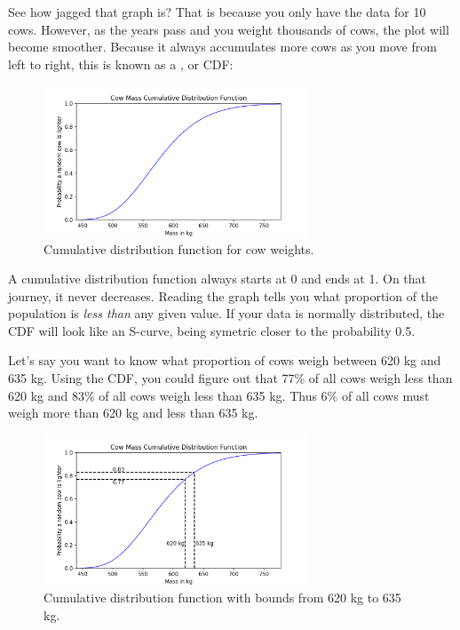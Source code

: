 See how jagged that graph is?  That is because you only have the data for 10 cows. However, as the years pass and you weight thousands of cows, the plot will become smoother. Because it
always accumulates more cows as you move from left to right, this is known as a , or CDF:
\begin{figure}[htbp]
    \centering
    \includegraphics[width=0.7\textwidth]{cow_cdf.png}
    \caption{Cumulative distribution function for cow weights.}
    \label{fig:cowcdf}
\end{figure}

A cumulative distribution function always starts at 0 and ends at 1. On that journey, it never decreases. Reading the graph tells you what proportion of the population is \emph{less than} any given value. If your data is normally distributed,  the CDF will look like an S-curve, being symetric closer to the probability 0.5. 

Let's say you want to know what proportion of cows weigh between 620 kg and 635 kg. Using the CDF, you could figure out that 77\% of all cows weigh less than 620 kg and 83\% of all cows 
weigh less than 635 kg. Thus 6\% of all cows must weigh more than 620 kg and less than 635 kg.
\begin{figure}[htbp]
    \centering
    \includegraphics[width=0.7\textwidth]{cow_cdf_bounds.png}
    \caption{Cumulative distribution function with bounds from 620 kg to 635 kg.}
    \label{fig:cowcdfbounds}
\end{figure}

